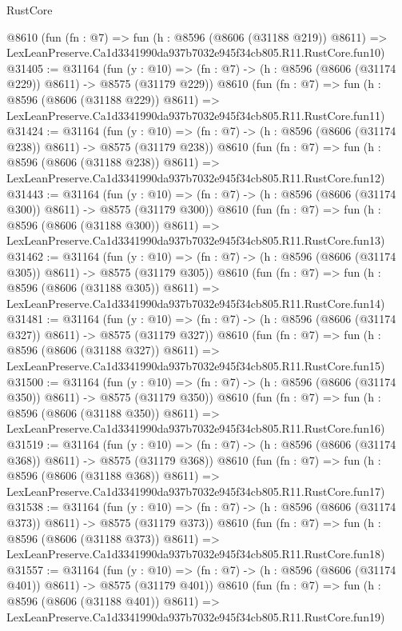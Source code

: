 \begin{lexlean}{RustCore}
\begin{coremodule}
    @8610
    (fun (fn : @7) =>
    fun (h : @8596 (@8606 (@31188 @219)) @8611) =>
    LexLeanPreserve.Ca1d3341990da937b7032e945f34cb805.R11.RustCore.fun10)
@31405 := @31164
    (fun (y : @10) => (fn : @7) -> (h : @8596 (@8606 (@31174 @229)) @8611) -> @8575 (@31179 @229))
    @8610
    (fun (fn : @7) =>
    fun (h : @8596 (@8606 (@31188 @229)) @8611) =>
    LexLeanPreserve.Ca1d3341990da937b7032e945f34cb805.R11.RustCore.fun11)
@31424 := @31164
    (fun (y : @10) => (fn : @7) -> (h : @8596 (@8606 (@31174 @238)) @8611) -> @8575 (@31179 @238))
    @8610
    (fun (fn : @7) =>
    fun (h : @8596 (@8606 (@31188 @238)) @8611) =>
    LexLeanPreserve.Ca1d3341990da937b7032e945f34cb805.R11.RustCore.fun12)
@31443 := @31164
    (fun (y : @10) => (fn : @7) -> (h : @8596 (@8606 (@31174 @300)) @8611) -> @8575 (@31179 @300))
    @8610
    (fun (fn : @7) =>
    fun (h : @8596 (@8606 (@31188 @300)) @8611) =>
    LexLeanPreserve.Ca1d3341990da937b7032e945f34cb805.R11.RustCore.fun13)
@31462 := @31164
    (fun (y : @10) => (fn : @7) -> (h : @8596 (@8606 (@31174 @305)) @8611) -> @8575 (@31179 @305))
    @8610
    (fun (fn : @7) =>
    fun (h : @8596 (@8606 (@31188 @305)) @8611) =>
    LexLeanPreserve.Ca1d3341990da937b7032e945f34cb805.R11.RustCore.fun14)
@31481 := @31164
    (fun (y : @10) => (fn : @7) -> (h : @8596 (@8606 (@31174 @327)) @8611) -> @8575 (@31179 @327))
    @8610
    (fun (fn : @7) =>
    fun (h : @8596 (@8606 (@31188 @327)) @8611) =>
    LexLeanPreserve.Ca1d3341990da937b7032e945f34cb805.R11.RustCore.fun15)
@31500 := @31164
    (fun (y : @10) => (fn : @7) -> (h : @8596 (@8606 (@31174 @350)) @8611) -> @8575 (@31179 @350))
    @8610
    (fun (fn : @7) =>
    fun (h : @8596 (@8606 (@31188 @350)) @8611) =>
    LexLeanPreserve.Ca1d3341990da937b7032e945f34cb805.R11.RustCore.fun16)
@31519 := @31164
    (fun (y : @10) => (fn : @7) -> (h : @8596 (@8606 (@31174 @368)) @8611) -> @8575 (@31179 @368))
    @8610
    (fun (fn : @7) =>
    fun (h : @8596 (@8606 (@31188 @368)) @8611) =>
    LexLeanPreserve.Ca1d3341990da937b7032e945f34cb805.R11.RustCore.fun17)
@31538 := @31164
    (fun (y : @10) => (fn : @7) -> (h : @8596 (@8606 (@31174 @373)) @8611) -> @8575 (@31179 @373))
    @8610
    (fun (fn : @7) =>
    fun (h : @8596 (@8606 (@31188 @373)) @8611) =>
    LexLeanPreserve.Ca1d3341990da937b7032e945f34cb805.R11.RustCore.fun18)
@31557 := @31164
    (fun (y : @10) => (fn : @7) -> (h : @8596 (@8606 (@31174 @401)) @8611) -> @8575 (@31179 @401))
    @8610
    (fun (fn : @7) =>
    fun (h : @8596 (@8606 (@31188 @401)) @8611) =>
    LexLeanPreserve.Ca1d3341990da937b7032e945f34cb805.R11.RustCore.fun19)

\end{coremodule}
\end{lexlean}
